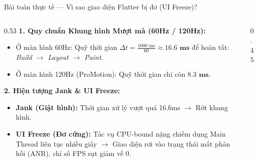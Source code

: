 \documentclass[aspectratio=169, 10pt]{beamer}
\begin{document}
\begin{frame}{Bài toán thực tế --- Vì sao giao diện Flutter bị đơ (UI Freeze)?}
  \vspace{-0.2cm}
  \begin{columns}[c]
    \begin{column}{0.53\textwidth}
      \small
      \textbf{1. Quy chuẩn Khung hình Mượt mà (60Hz / 120Hz):}
      \begin{itemize}
        \item Ở màn hình 60Hz: Quỹ thời gian $\Delta t = \frac{1000\text{ ms}}{60} \approx \mathbf{16.6\text{ ms}}$ để hoàn tất: \textit{Build $\rightarrow$ Layout $\rightarrow$ Paint}.
        \item Ở màn hình 120Hz (ProMotion): Quỹ thời gian chỉ còn $\mathbf{8.3\text{ ms}}$.
      \end{itemize}
      \vspace{0.08cm}
      \textbf{2. Hiện tượng Jank \& UI Freeze:}
      \begin{itemize}
        \item \textbf{Jank (Giật hình):} Thời gian xử lý vượt quá 16.6ms $\rightarrow$ Rớt khung hình.
        \item \textbf{UI Freeze (Đơ cứng):} Tác vụ CPU-bound nặng chiếm dụng Main Thread liên tục nhiều giây $\rightarrow$ Giao diện rơi vào trạng thái mất phản hồi (ANR), chỉ số FPS sụt giảm về 0.
      \end{itemize}
    \end{column}

    \begin{column}{0.45\textwidth}
      \centering
    \end{column}
  \end{columns}
\end{frame}
\end{document}
